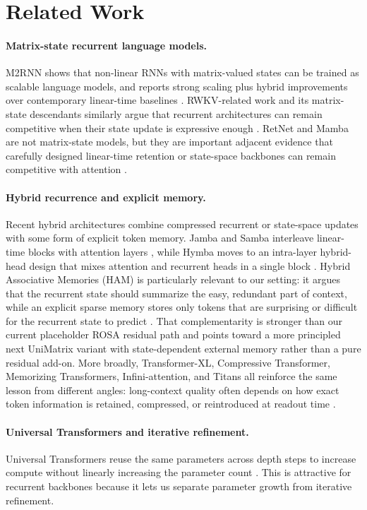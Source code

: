 \documentclass[11pt]{article}
\begin{document}
\section{Related Work}
\paragraph{Matrix-state recurrent language models.}
M2RNN shows that non-linear RNNs with matrix-valued states can be trained as
scalable language models, and reports strong scaling plus hybrid improvements
over contemporary linear-time baselines \citep{m2rnn2026}. RWKV-related work
and its matrix-state descendants similarly argue that recurrent architectures
can remain competitive when their state update is expressive enough
\citep{eaglefinch2024}. RetNet and Mamba are not matrix-state models, but they
are important adjacent evidence that carefully designed linear-time retention
or state-space backbones can remain competitive with attention
\citep{retnet2023,mamba2023}.

\paragraph{Hybrid recurrence and explicit memory.}
Recent hybrid architectures combine compressed recurrent or state-space updates
with some form of explicit token memory. Jamba and Samba interleave linear-time
blocks with attention layers \citep{jamba2024, samba2024}, while Hymba moves to
an intra-layer hybrid-head design that mixes attention and recurrent heads in a
single block \citep{hymba2024}. Hybrid Associative Memories (HAM) is
particularly relevant to our setting: it argues that the recurrent state should
summarize the easy, redundant part of context, while an explicit sparse memory
stores only tokens that are surprising or difficult for the recurrent state to
predict \citep{ham2026}. That complementarity is stronger than our current
placeholder ROSA residual path and points toward a more principled next
UniMatrix variant with state-dependent external memory rather than a pure
residual add-on. More broadly, Transformer-XL, Compressive Transformer,
Memorizing Transformers, Infini-attention, and Titans all reinforce the same
lesson from different angles: long-context quality often depends on how exact
token information is retained, compressed, or reintroduced at readout time
\citep{transformerxl2019,compressive2019,memorizing2022,
infiniattention2024,titans2025}.

\paragraph{Universal Transformers and iterative refinement.}
Universal Transformers reuse the same parameters across depth steps to increase
compute without linearly increasing the parameter count \citep{dehghani2019universal}.
This is attractive for recurrent backbones because it lets us separate
parameter growth from iterative refinement.
\end{document}
